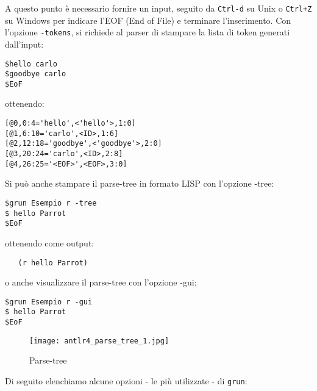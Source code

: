 \documentclass{article}
\begin{document}
A questo punto è necessario fornire un input, seguito da \texttt{Ctrl-d} su Unix o \texttt{Ctrl+Z} su Windows per indicare l'EOF (End of File) e terminare l'inserimento. Con l'opzione \texttt{-tokens}, si richiede al parser di stampare la lista di token generati dall'input:
\begin{verbatim}
$hello carlo
$goodbye carlo
$EoF
 \end{verbatim}
ottenendo:
\begin{verbatim}
[@0,0:4='hello',<'hello'>,1:0]
[@1,6:10='carlo',<ID>,1:6]
[@2,12:18='goodbye',<'goodbye'>,2:0]
[@3,20:24='carlo',<ID>,2:8]
[@4,26:25='<EOF>',<EOF>,3:0]
   \end{verbatim}
Si può anche stampare il parse-tree in formato LISP con l'opzione -tree:
\begin{verbatim}
$grun Esempio r -tree
$ hello Parrot
$EoF
   \end{verbatim}
   ottenendo come output:
  \begin{verbatim} 
   (r hello Parrot)
   \end{verbatim}
o anche visualizzare il parse-tree con l'opzione -gui:
\begin{verbatim}
$grun Esempio r -gui
$ hello Parrot
$EoF
   \end{verbatim}
    \begin{figure} [H]
        \centering
        \texttt{[image: antlr4\_parse\_tree\_1.jpg]}
        \caption{Parse-tree}
        \label{fig:enter-label}
    \end{figure}
\noindent
Di seguito elenchiamo alcune opzioni - le più utilizzate - di \texttt{grun}:
\end{document}

